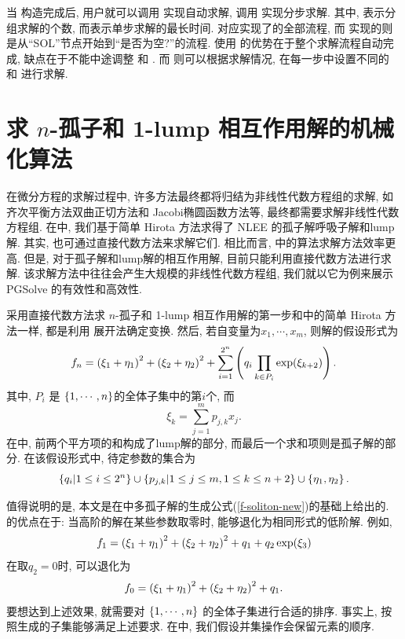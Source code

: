 当  构造完成后, 用户就可以调用  实现自动求解, 调用  实现分步求解. 其中, 表示分组求解的个数, 而表示单步求解的最长时间.   对应实现了的全部流程, 而  实现的则是从``SOL''节点开始到``是否为空?''的流程. 使用  的优势在于整个求解流程自动完成, 缺点在于不能中途调整  和 . 而  则可以根据求解情况, 在每一步中设置不同的  和  进行求解. 

\section{求 $n$-孤子和 1-lump 相互作用解的机械化算法}
在微分方程的求解过程中, 许多方法最终都将归结为非线性代数方程组的求解, 如齐次平衡方法\D 双曲正切方法和 Jacobi椭圆函数方法等, 最终都需要求解非线性代数方程组. 在中, 我们基于简单 Hirota 方法求得了 NLEE 的孤子解\D 呼吸子解和lump 解. 其实, 也可通过直接代数方法来求解它们. 相比而言, 中的算法求解方法效率更高. 但是, 对于孤子解和lump解的相互作用解, 目前只能利用直接代数方法进行求解. 该求解方法中往往会产生大规模的非线性代数方程组, 我们就以它为例来展示 PGSolve 的有效性和高效性. 

采用直接代数方法求 $n$-孤子和 1-lump 相互作用解的第一步和中的简单 Hirota 方法一样, 都是利用 \Painleve{}展开法确定变换. 然后, 若自变量为$x_1,\cdots,x_m$, 则解的假设形式为
\begin{equation}
f_n=\left(\xi_1+\eta_1\right)^2+\left(\xi_2+\eta_2\right)^2+\sum_{i=1}^{2^n}\left(q_i\prod_{k \in P_i}{\exp(\xi_{k+2})}\right). \label{f-ns1l}
\end{equation}
其中, $P_i$ 是 $\left\{1,\cdots,n\right\}$的全体子集中的第$i$个, 而
\begin{equation}
\xi_k=\sum_{j=1}^m{p_{j,k}x_j}.
\end{equation}
在中, 前两个平方项的和构成了lump解的部分, 而最后一个求和项则是孤子解的部分. 在该假设形式中, 待定参数的集合为
\begin{equation}
    \left\{q_i|1\le i \le 2^n\right\} \cup \left\{p_{j,k}|1\le j \le m, 1\le k \le n+2\right\} \cup \left\{\eta_1,\eta_2\right\}. 
\end{equation}

值得说明的是, 本文是在中多孤子解的生成公式(\ref{f-soliton-new})的基础上给出的. 的优点在于: 当高阶的解在某些参数取零时, 能够退化为相同形式的低阶解. 例如,
\begin{equation}
    f_1=\left(\xi_1+\eta_1\right)^2+\left(\xi_2+\eta_2\right)^2+q_1+q_2 \exp(\xi_3)
\end{equation}
在取$q_2=0$时, 可以退化为
\begin{equation}
    f_0=\left(\xi_1+\eta_1\right)^2+\left(\xi_2+\eta_2\right)^2+q_1.
\end{equation}
要想达到上述效果, 就需要对 $\left\{1,\cdots,n\right\}$ 的全体子集进行合适的排序. 事实上, 按照生成的子集能够满足上述要求. 在中, 我们假设并集操作会保留元素的顺序. 


